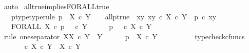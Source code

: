 \begin{isabellebody}
\ auto\isanewline
{}\isamarkupfalse%
%
\endisatagproof
{\isafoldproof}%
%
\isadelimproof
\isanewline
%
\endisadelimproof
\isanewline
{}\isamarkupfalse%
\ all{\isacharunderscore}{\kern0pt}true{\isacharunderscore}{\kern0pt}implies{\isacharunderscore}{\kern0pt}FORALL{\isacharunderscore}{\kern0pt}true{}{\isacharcolon}{\kern0pt}\isanewline
\ \ \ p{\isacharunderscore}{\kern0pt}type{\isacharbrackleft}{\kern0pt}type{\isacharunderscore}{\kern0pt}rule{\isacharbrackright}{\kern0pt}{\isacharcolon}{\kern0pt}\ {\isachardoublequoteopen}p\ {\isacharcolon}{\kern0pt}\ X\ {\isasymtimes}\isactrlsub c\ Y\ {\isasymrightarrow}\ {\isasymOmega}{\isachardoublequoteclose}\ \ all{\isacharunderscore}{\kern0pt}p{\isacharunderscore}{\kern0pt}true{\isacharcolon}{\kern0pt}\ {\isachardoublequoteopen}{\isasymAnd}\ xy{\isachardot}{\kern0pt}\ xy\ {\isasymin}\isactrlsub c\ X\ {\isasymtimes}\isactrlsub c\ Y\ {\isasymLongrightarrow}\ p\ {\isasymcirc}\isactrlsub c\ xy\ {\isacharequal}{\kern0pt}\ {\isasymt}{\isachardoublequoteclose}\isanewline
\ \ \ {\isachardoublequoteopen}FORALL\ X\ {\isasymcirc}\isactrlsub c\ p\isactrlsup {\isasymsharp}\ {\isacharequal}{\kern0pt}\ {\isasymt}\ {\isasymcirc}\isactrlsub c\ {\isasymbeta}\isactrlbsub Y\isactrlesub {\isachardoublequoteclose}\isanewline
%
\isadelimproof
%
\endisadelimproof
%
\isatagproof
{}\isamarkupfalse%
\ {\isacharminus}{\kern0pt}\isanewline
\ \ \isamarkupfalse%
\ {\isachardoublequoteopen}p\ {\isacharequal}{\kern0pt}\ {\isasymt}\ {\isasymcirc}\isactrlsub c\ {\isasymbeta}\isactrlbsub X\ {\isasymtimes}\isactrlsub c\ Y\isactrlesub {\isachardoublequoteclose}\isanewline
\ \ \isamarkupfalse%
\ {\isacharparenleft}{\kern0pt}rule\ one{\isacharunderscore}{\kern0pt}separator{\isacharbrackleft}{\kern0pt}\ X{\isacharequal}{\kern0pt}{\isachardoublequoteopen}X\ {\isasymtimes}\isactrlsub c\ Y{\isachardoublequoteclose}{\isacharcomma}{\kern0pt}\ \ Y{\isacharequal}{\kern0pt}{\isasymOmega}{\isacharbrackright}{\kern0pt}{\isacharparenright}{\kern0pt}\isanewline
\ \ \ \ \isamarkupfalse%
\ {\isachardoublequoteopen}p\ {\isacharcolon}{\kern0pt}\ X\ {\isasymtimes}\isactrlsub c\ Y\ {\isasymrightarrow}\ {\isasymOmega}{\isachardoublequoteclose}\isanewline
\ \ \ \ \ \ \isamarkupfalse%
\ typecheck{\isacharunderscore}{\kern0pt}cfuncs\isanewline
\ \ \ \ \isamarkupfalse%
\ {\isachardoublequoteopen}{\isasymt}\ {\isasymcirc}\isactrlsub c\ {\isasymbeta}\isactrlbsub X\ {\isasymtimes}\isactrlsub c\ Y\isactrlesub \ {\isacharcolon}{\kern0pt}\ X\ {\isasymtimes}\isactrlsub c\ Y\ {\isasymrightarrow}\ {\isasymOmega}{\isachardoublequoteclose}\isanewline

\end{isabellebody}

